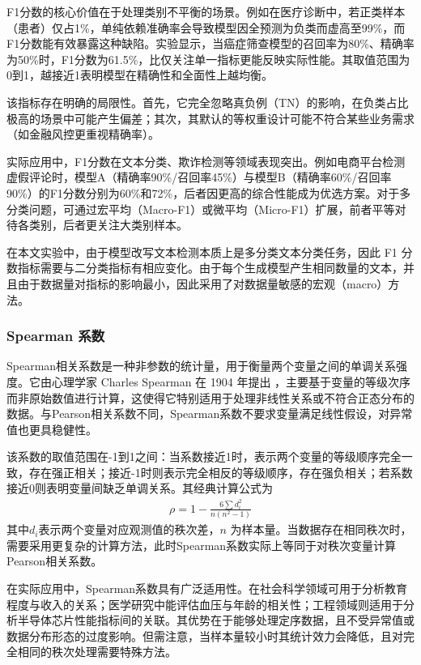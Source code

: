 F1分数的核心价值在于处理类别不平衡的场景。例如在医疗诊断中，若正类样本（患者）仅占1\%，单纯依赖准确率会导致模型因全预测为负类而虚高至99\%，而F1分数能有效暴露这种缺陷。实验显示，当癌症筛查模型的召回率为80\%、精确率为50\%时，F1分数为61.5\%，比仅关注单一指标更能反映实际性能。其取值范围为0到1，越接近1表明模型在精确性和全面性上越均衡。

该指标存在明确的局限性。首先，它完全忽略真负例（TN）的影响，在负类占比极高的场景中可能产生偏差；其次，其默认的等权重设计可能不符合某些业务需求（如金融风控更重视精确率）。

实际应用中，F1分数在文本分类、欺诈检测等领域表现突出。例如电商平台检测虚假评论时，模型A（精确率90\%/召回率45\%）与模型B（精确率60\%/召回率90\%）的F1分数分别为60\%和72\%，后者因更高的综合性能成为优选方案。对于多分类问题，可通过宏平均（Macro-F1）或微平均（Micro-F1）扩展，前者平等对待各类别，后者更关注大类别样本。

在本文实验中，由于模型改写文本检测本质上是多分类文本分类任务，因此 F1 分数指标需要与二分类指标有相应变化。由于每个生成模型产生相同数量的文本，并且由于数据量对指标的影响最小，因此采用了对数据量敏感的宏观（macro）方法。

\subsubsection{Spearman 系数}

Spearman相关系数是一种非参数的统计量，用于衡量两个变量之间的单调关系强度。它由心理学家 Charles Spearman 在 1904 年提出 \cite{Spearman}，主要基于变量的等级次序而非原始数值进行计算，这使得它特别适用于处理非线性关系或不符合正态分布的数据。与Pearson相关系数不同，Spearman系数不要求变量满足线性假设，对异常值也更具稳健性。

该系数的取值范围在-1到1之间：当系数接近1时，表示两个变量的等级顺序完全一致，存在强正相关；接近-1时则表示完全相反的等级顺序，存在强负相关；若系数接近0则表明变量间缺乏单调关系。其经典计算公式为
\begin{align}
    \rho = 1 - \frac{6\sum d_i^2}{n(n^2-1)}
\end{align}
其中$d_i$表示两个变量对应观测值的秩次差，$n$ 为样本量。当数据存在相同秩次时，需要采用更复杂的计算方法，此时Spearman系数实际上等同于对秩次变量计算Pearson相关系数。

在实际应用中，Spearman系数具有广泛适用性。在社会科学领域可用于分析教育程度与收入的关系；医学研究中能评估血压与年龄的相关性；工程领域则适用于分析半导体芯片性能指标间的关联。其优势在于能够处理定序数据，且不受异常值或数据分布形态的过度影响。但需注意，当样本量较小时其统计效力会降低，且对完全相同的秩次处理需要特殊方法。

